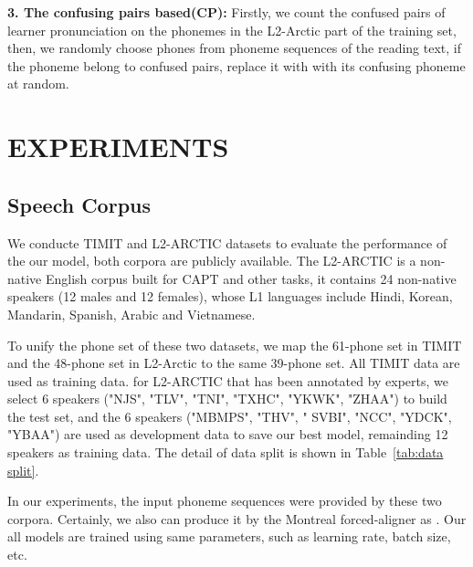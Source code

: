 \documentclass[a4paper]{article}
\begin{document}
\noindent\textbf{3. The confusing pairs based(CP):} Firstly, we count the confused pairs of learner pronunciation on the phonemes in the L2-Arctic part of the training set, then, we randomly choose phones from phoneme sequences of the reading text, if the phoneme belong to confused pairs, replace it with with its confusing phoneme at random.



\section{EXPERIMENTS}
\subsection{Speech Corpus}
We conducte TIMIT \cite{timit} and L2-ARCTIC \cite{l2arctic}{} datasets to evaluate the performance of the our model, both corpora are publicly available. The L2-ARCTIC is a non-native English corpus built for CAPT and other tasks, it contains 24 non-native speakers (12 males and 12 females), whose L1 languages include Hindi, Korean, Mandarin, Spanish, Arabic and Vietnamese.

To unify the phone set of these two datasets, we map the 61-phone set in TIMIT and the 48-phone set in L2-Arctic to the same 39-phone set. All TIMIT data are used as training data. for L2-ARCTIC that has been annotated by experts, we select 6 speakers ("NJS", "TLV", "TNI", "TXHC", "YKWK", "ZHAA") to build the test set, and the 6 speakers ("MBMPS", "THV", " SVBI", "NCC", "YDCK", "YBAA") are used as development data to save our best model, remainding 12 speakers as training data.  The detail of data split is shown in Table~\ref{tab:data split}.



In our experiments, the input phoneme sequences were provided by these two corpora. Certainly, we also can produce it by the Montreal forced-aligner \cite{forcealign} as \cite{l2arctic}. Our all models are trained using same parameters, such as learning rate, batch size, etc. 
\end{document}
